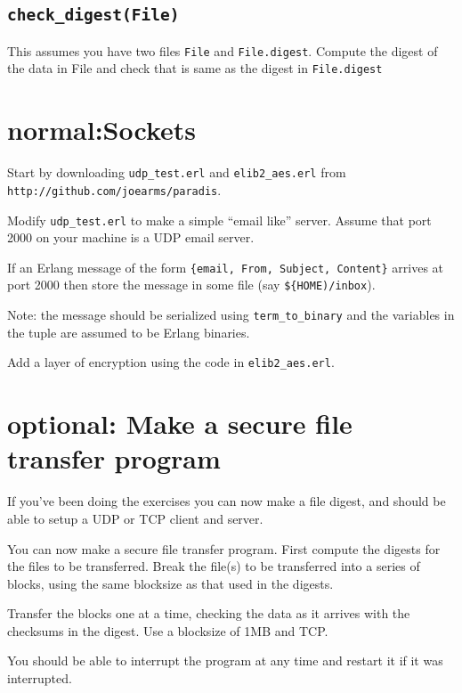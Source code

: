\documentclass[12pt]{hitec}
\begin{document}
\subsection{\texttt{check\_digest(File)}}
This assumes you have two files \verb+File+ and \verb+File.digest+.
Compute the digest of the data in File and check that is same as the digest in
\verb+File.digest+

\section{normal:Sockets}

Start by downloading \verb+udp_test.erl+ and \verb+elib2_aes.erl+
from\\
\verb+http://github.com/joearms/paradis+.

Modify \verb+udp_test.erl+  to make a simple ``email like'' server.
Assume that port 2000 on your machine is a UDP email server.

If an Erlang message of the form \verb+{email, From, Subject, Content}+
arrives at port 2000 then store the message in some file (say \verb+${HOME)/inbox+).

Note: the message should be serialized using \verb+term_to_binary+ and
the variables in the tuple are assumed to be Erlang binaries.

Add a layer of encryption using the code in \verb+elib2_aes.erl+.

\section{optional: Make a secure file transfer program}

If you've been doing the exercises you can now make a file digest, and
should be able to setup a UDP or TCP client and server.

You can now make a secure file transfer program.  First compute the
digests for the files to be transferred. Break the file(s) to be
transferred into a series of blocks, using the same blocksize as that
used in the digests.

Transfer the blocks one at a time, checking the data as it arrives
with the checksums in the digest. Use a blocksize of 1MB and TCP.

You should be able to interrupt the program at any time and restart it
if it was interrupted.

 
\end{document}
